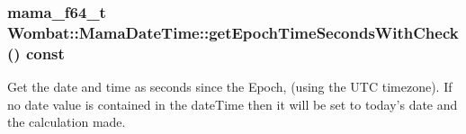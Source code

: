 \label{classWombat_1_1MamaDateTime_a94e87557d8bc08a050933b166c79cc44}
\hypertarget{classWombat_1_1MamaDateTime_afb79d97c80195c594bd155aefad733db}{
\subsubsection[{getEpochTimeSecondsWithCheck}]{\setlength{\rightskip}{0pt plus 5cm}mama\_\-f64\_\-t Wombat::MamaDateTime::getEpochTimeSecondsWithCheck () const}}
\label{classWombat_1_1MamaDateTime_afb79d97c80195c594bd155aefad733db}


Get the date and time as seconds since the Epoch, (using the UTC timezone). If no date value is contained in the dateTime then it will be set to today's date and the calculation made.

